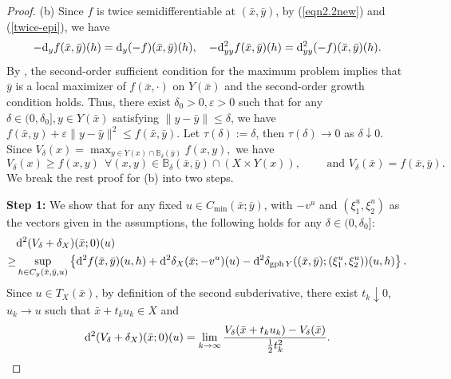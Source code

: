 \documentclass[11pt]{article}
\numberwithin{equation}{section}
\begin{document}
{\begin{proof}
(b) Since $f$ is twice semidifferentiable at $(\bar x,\bar y)$, by (\ref{eqn2.2new}) and (\ref{twice-epi}), we have
$$-{\rm d}_y f(\bar x,\bar y)(h)={\rm d}_y (-f)(\bar x,\bar y)(h), \quad -{\rm d}_{yy}^2 f(\bar x,\bar y)(h)={\rm d}_{yy}^2 (-f)(\bar x,\bar y)(h).$$ By \cite[Proposition 2.9]{Ma2023}, the second-order sufficient condition for the maximum problem implies that $\bar y$ is a local maximizer of $f(\bar x,\cdot)$ on $ Y(\bar x)$ and the second-order growth condition holds. Thus, there exist $\delta_0>0, \varepsilon>0$ such that for any $\delta \in (0,\delta_0], y\in Y(\bar x)$ satisfying $\|y-\bar{y}\| \leq \delta$, we have  $f(\bar x,y) +\varepsilon\|y-\bar y\|^2\leq f(\bar x,\bar y)$. Let $\tau(\delta):=\delta$, then $\tau(\delta) \rightarrow 0$ as $\delta \downarrow 0$.
Since
$V_\delta(x)=\max_{y  \in  Y(x)\cap \mathbb{B}_\delta(\bar y)}f(x,y),$
we have
\begin{equation}\label{eqn4.13} V_\delta( x)\geq f(x,y) \ \ \forall (x,y)\in \mathbb{B}_\delta(\bar x,\bar y)\cap (X\times Y(x)), \qquad \mbox{ and } V_\delta(\bar x)=f(\bar x,\bar y).\end{equation}
We break the rest proof for (b) into two steps.

{\bf Step 1:} We show that for any fixed $u \in C_{\min}(\bar x; \bar y)$, with $-v^u$ and $(\xi_1^u, \xi_2^u)$ as the vectors given in the assumptions, the following holds for any $\delta \in (0, \delta_0]$:
\begin{equation}\label{lowerbd2}
	\begin{aligned}
		&{\rm d}^2 (V_{\delta}+\delta_X)(\bar x;0)(u) \\
		\geq& \sup_{h \in C_{y}(\bar x,\bar y,u) } \left\{ {\rm d}^2 f(\bar x,\bar y)(u,h) + {\rm d}^2 \delta_X(\bar x;-v^u)(u) -{\rm d}^2 \delta_{\operatorname{gph}Y}((\bar x,\bar y);(\xi_1^u,\xi_2^u))(u,h) \right\}.
	\end{aligned}
\end{equation}
Since $u \in T_X(\bar x) $, by definition of the second subderivative, there exist $t_k\downarrow 0$, $u_k\to u$ such that  $\bar x+t_ku_k \in X$ and
\begin{equation}\label{main-1}
	{\rm d}^2 (V_{\delta}+\delta_X)(\bar x;0)(u)
	= \lim\limits_{k \to \infty} \frac{V_{\delta}(\bar{x}+t_ku_k)-V_{\delta}(\bar{x})}{\frac{1}{2}t_k^2}.
\end{equation}


\end{proof}}
\end{document}
